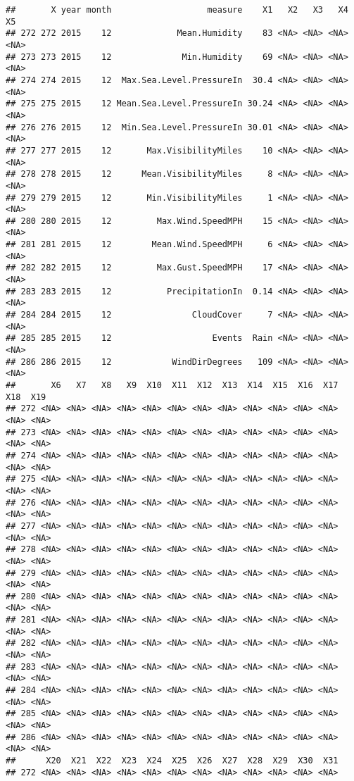 \documentclass[]{article}
\begin{document}
\begin{verbatim}
##       X year month                   measure    X1   X2   X3   X4   X5
## 272 272 2015    12             Mean.Humidity    83 <NA> <NA> <NA> <NA>
## 273 273 2015    12              Min.Humidity    69 <NA> <NA> <NA> <NA>
## 274 274 2015    12  Max.Sea.Level.PressureIn  30.4 <NA> <NA> <NA> <NA>
## 275 275 2015    12 Mean.Sea.Level.PressureIn 30.24 <NA> <NA> <NA> <NA>
## 276 276 2015    12  Min.Sea.Level.PressureIn 30.01 <NA> <NA> <NA> <NA>
## 277 277 2015    12       Max.VisibilityMiles    10 <NA> <NA> <NA> <NA>
## 278 278 2015    12      Mean.VisibilityMiles     8 <NA> <NA> <NA> <NA>
## 279 279 2015    12       Min.VisibilityMiles     1 <NA> <NA> <NA> <NA>
## 280 280 2015    12         Max.Wind.SpeedMPH    15 <NA> <NA> <NA> <NA>
## 281 281 2015    12        Mean.Wind.SpeedMPH     6 <NA> <NA> <NA> <NA>
## 282 282 2015    12         Max.Gust.SpeedMPH    17 <NA> <NA> <NA> <NA>
## 283 283 2015    12           PrecipitationIn  0.14 <NA> <NA> <NA> <NA>
## 284 284 2015    12                CloudCover     7 <NA> <NA> <NA> <NA>
## 285 285 2015    12                    Events  Rain <NA> <NA> <NA> <NA>
## 286 286 2015    12            WindDirDegrees   109 <NA> <NA> <NA> <NA>
##       X6   X7   X8   X9  X10  X11  X12  X13  X14  X15  X16  X17  X18  X19
## 272 <NA> <NA> <NA> <NA> <NA> <NA> <NA> <NA> <NA> <NA> <NA> <NA> <NA> <NA>
## 273 <NA> <NA> <NA> <NA> <NA> <NA> <NA> <NA> <NA> <NA> <NA> <NA> <NA> <NA>
## 274 <NA> <NA> <NA> <NA> <NA> <NA> <NA> <NA> <NA> <NA> <NA> <NA> <NA> <NA>
## 275 <NA> <NA> <NA> <NA> <NA> <NA> <NA> <NA> <NA> <NA> <NA> <NA> <NA> <NA>
## 276 <NA> <NA> <NA> <NA> <NA> <NA> <NA> <NA> <NA> <NA> <NA> <NA> <NA> <NA>
## 277 <NA> <NA> <NA> <NA> <NA> <NA> <NA> <NA> <NA> <NA> <NA> <NA> <NA> <NA>
## 278 <NA> <NA> <NA> <NA> <NA> <NA> <NA> <NA> <NA> <NA> <NA> <NA> <NA> <NA>
## 279 <NA> <NA> <NA> <NA> <NA> <NA> <NA> <NA> <NA> <NA> <NA> <NA> <NA> <NA>
## 280 <NA> <NA> <NA> <NA> <NA> <NA> <NA> <NA> <NA> <NA> <NA> <NA> <NA> <NA>
## 281 <NA> <NA> <NA> <NA> <NA> <NA> <NA> <NA> <NA> <NA> <NA> <NA> <NA> <NA>
## 282 <NA> <NA> <NA> <NA> <NA> <NA> <NA> <NA> <NA> <NA> <NA> <NA> <NA> <NA>
## 283 <NA> <NA> <NA> <NA> <NA> <NA> <NA> <NA> <NA> <NA> <NA> <NA> <NA> <NA>
## 284 <NA> <NA> <NA> <NA> <NA> <NA> <NA> <NA> <NA> <NA> <NA> <NA> <NA> <NA>
## 285 <NA> <NA> <NA> <NA> <NA> <NA> <NA> <NA> <NA> <NA> <NA> <NA> <NA> <NA>
## 286 <NA> <NA> <NA> <NA> <NA> <NA> <NA> <NA> <NA> <NA> <NA> <NA> <NA> <NA>
##      X20  X21  X22  X23  X24  X25  X26  X27  X28  X29  X30  X31
## 272 <NA> <NA> <NA> <NA> <NA> <NA> <NA> <NA> <NA> <NA> <NA> <NA>

\end{verbatim}
\end{document}
